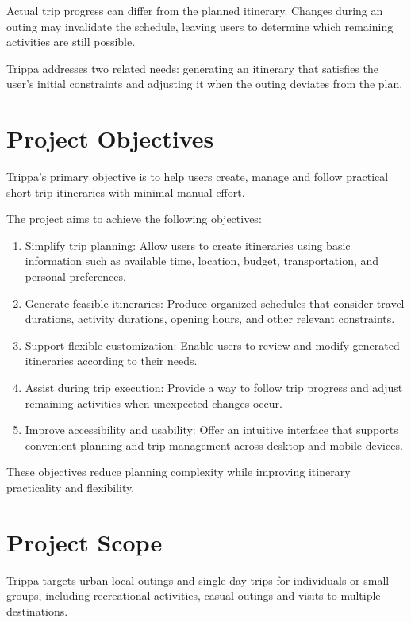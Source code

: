 Actual trip progress can differ from the planned itinerary. Changes during an outing may invalidate the schedule, leaving users to determine which remaining activities are still possible.


Trippa addresses two related needs: generating an itinerary that satisfies the user's initial constraints and adjusting it when the outing deviates from the plan.


\section{Project Objectives}

Trippa's primary objective is to help users create, manage and follow practical short-trip itineraries with minimal manual effort.


The project aims to achieve the following objectives:


\begin{enumerate}
\item Simplify trip planning: Allow users to create itineraries using basic information such as available time, location, budget, transportation, and personal preferences.
\item Generate feasible itineraries: Produce organized schedules that consider travel durations, activity durations, opening hours, and other relevant constraints.
\item Support flexible customization: Enable users to review and modify generated itineraries according to their needs.
\item Assist during trip execution: Provide a way to follow trip progress and adjust remaining activities when unexpected changes occur.
\item Improve accessibility and usability: Offer an intuitive interface that supports convenient planning and trip management across desktop and mobile devices.
\end{enumerate}


These objectives reduce planning complexity while improving itinerary practicality and flexibility.


\section{Project Scope}

Trippa targets urban local outings and single-day trips for individuals or small groups, including recreational activities, casual outings and visits to multiple destinations.


